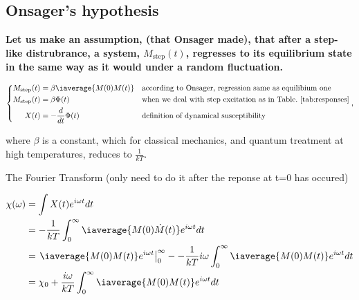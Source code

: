 \newpage \subsection{Onsager's hypothesis}
\begin{framed}\noindent
  \textbf{Let us make an assumption,  (that Onsager made), that after a
    step-like distrubrance,  a system, $ M_\text{step}(t)  $, regresses
    to its equilibrium state in the same way as it would under a random
    fluctuation.
  }
\end{framed}
\begin{equation}
  \left\lbrace\begin{aligned}
      M_\text{step}(t) & = \beta\iaverage{M(0)M(t)} && \text{according to Onsager, regression same as equilibium one}\\
      M_\text{step}(t) & = \beta\Phi(t) && \text{when we deal with step excitation as in Table.~\ref{tab:responses}}\\
      X(t) & = -\frac{d}{dt}\Phi(t) && \text{definition of dynamical susceptibility}
    \end{aligned}\right.,
\end{equation}

\noindent where $ \beta $ is a constant, which for classical mechanics, and
quantum treatment at high temperatures, reduces to $ \frac{1}{kT} $.

The Fourier Transform (only need to do  it after the reponse at t=0 has
occured)

\begin{equation}\label{eqn:susceptibility_from_response_0}
  \begin{aligned}
    \chi(\omega) & = \int X(t)e^{i\omega t} dt\\
    & = -\frac{1}{kT}\int_0^\infty\iaverage{M(0)\dot{M}(t)}e^{i\omega t}dt\\
    & = \left.\iaverage{M(0)M(t)}e^{i\omega t} \right|_0^\infty - - \frac{1}{kT}i\omega\int_{0}^\infty\iaverage{M(0)M(t)}e^{i\omega t}dt\\
    & = \chi_0 + \frac{i\omega}{kT}\int_{0}^\infty\iaverage{M(0)M(t)}e^{i\omega t}dt\\
  \end{aligned}
\end{equation}


